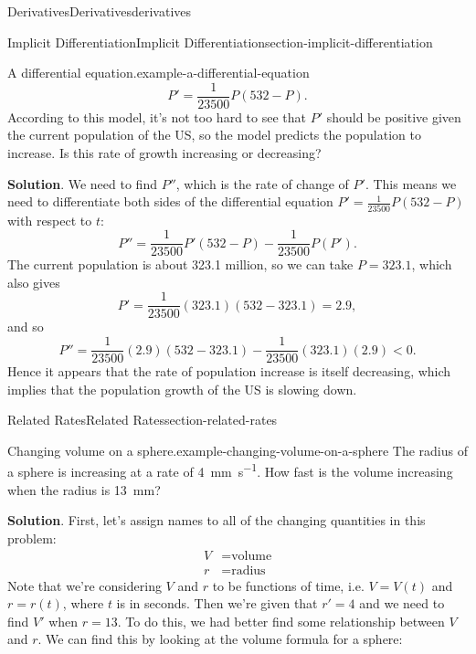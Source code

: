 \documentclass[oneside,10pt,]{book}
\numberwithin{equation}{section}
\begin{document}
\begin{chapterptx}{Derivatives}{}{Derivatives}{}{}{derivatives}
\begin{sectionptx}{Implicit Differentiation}{}{Implicit Differentiation}{}{}{section-implicit-differentiation}
\begin{example}{A differential equation.}{example-a-differential-equation}
\begin{equation*}
P' = \frac{1}{23500}P(532-P).
\end{equation*}
According to this model, it's not too hard to see that \(P'\) should be positive given the current population of the US, so the model predicts the population to increase. Is this rate of growth increasing or decreasing?%
\par\smallskip%
\noindent\textbf{Solution}.\hypertarget{solution-36}{}\quad%
\hypertarget{p-168}{}%
We need to find \(P''\), which is the rate of change of \(P'\). This means we need to differentiate both sides of the differential equation \(P' = \frac{1}{23500}P(532-P)\) with respect to \(t\):%
\begin{equation*}
P'' = \frac{1}{23500}P'(532-P) - \frac{1}{23500}P(P').
\end{equation*}
The current population is about 323.1 million, so we can take \(P=323.1\), which also gives%
\begin{equation*}
P' = \frac{1}{23500}(323.1)(532-323.1) = 2.9,
\end{equation*}
and so%
\begin{equation*}
P'' = \frac{1}{23500}(2.9)(532-323.1) - \frac{1}{23500}(323.1)(2.9) < 0.
\end{equation*}
Hence it appears that the rate of population increase is itself decreasing, which implies that the population growth of the US is slowing down.%
\end{example}
\end{sectionptx}
%
%
\typeout{************************************************}
\typeout{************************************************}
%
\begin{sectionptx}{Related Rates}{}{Related Rates}{}{}{section-related-rates}
\begin{example}{Changing volume on a sphere.}{example-changing-volume-on-a-sphere}%
\hypertarget{p-169}{}%
The radius of a sphere is increasing at a rate of \SI{4}{\milli\meter\per\second}. How fast is the volume increasing when the radius is \SI{13}{\milli\meter}?%
\par\smallskip%
\noindent\textbf{Solution}.\hypertarget{solution-37}{}\quad%
\hypertarget{p-170}{}%
First, let's assign names to all of the changing quantities in this problem:%
\begin{align*}
V & = \text{volume} \\
r & = \text{radius} 
\end{align*}
Note that we're considering \(V\) and \(r\) to be functions of time, i.e. \(V = V(t)\) and \(r=r(t)\), where \(t\) is in seconds. Then we're given that \(r' = 4\) and we need to find \(V'\) when \(r=13\). To do this, we had better find some relationship between \(V\) and \(r\). We can find this by looking at the volume formula for a sphere:%

\end{example}
\end{sectionptx}
\end{chapterptx}
\end{document}
